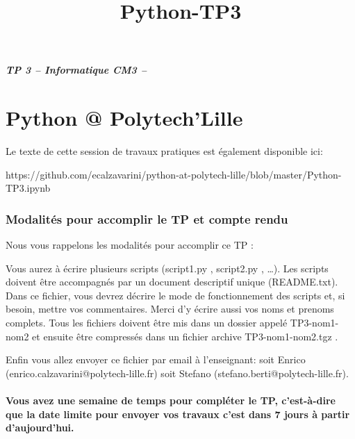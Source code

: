 \documentclass{article}
\title{Python-TP3}
\date{}
\begin{document}
    
    
    \maketitle
    
    

    
    \subparagraph{TP 3 -- Informatique CM3 --}\label{tp-3-informatique-cm3}

    \section{Python @ Polytech'Lille}\label{python-polytechlille}

    Le texte de cette session de travaux pratiques est également disponible
ici:

https://github.com/ecalzavarini/python-at-polytech-lille/blob/master/Python-TP3.ipynb

    \subsubsection{Modalités pour accomplir le TP et compte
rendu}\label{modalituxe9s-pour-accomplir-le-tp-et-compte-rendu}

    Nous vous rappelons les modalités pour accomplir ce TP :

Vous aurez à écrire plusieurs scripts (script1.py , script2.py ,
\ldots{}). Les scripts doivent être accompagnés par un document
descriptif unique (README.txt). Dans ce fichier, vous devrez décrire le
mode de fonctionnement des scripts et, si besoin, mettre vos
commentaires. Merci d'y écrire aussi vos noms et prenoms complets. Tous
les fichiers doivent être mis dans un dossier appelé TP3-nom1-nom2 et
ensuite être compressés dans un fichier archive TP3-nom1-nom2.tgz .

Enfin vous allez envoyer ce fichier par email à l'enseignant: soit
Enrico (enrico.calzavarini@polytech-lille.fr) soit Stefano
(stefano.berti@polytech-lille.fr).

    \paragraph{Vous avez une semaine de temps pour compléter le TP,
c'est-à-dire que la date limite pour envoyer vos travaux c'est dans 7
jours à partir
d'aujourd'hui.}\label{vous-avez-une-semaine-de-temps-pour-compluxe9ter-le-tp-cest-uxe0-dire-que-la-date-limite-pour-envoyer-vos-travaux-cest-dans-7-jours-uxe0-partir-daujourdhui.}
\end{document}

